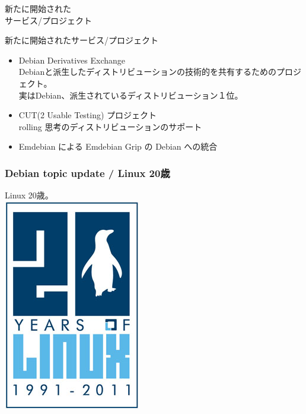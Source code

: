 \begin{frame}
\begin{center}
\LARGE{新たに開始された\\サービス/プロジェクト}
\end{center}
\end{frame}


\begin{frame}{新たに開始されたサービス/プロジェクト}
\begin{itemize}[<+->]
\item Debian Derivatives Exchange\\
Debianと派生したディストリビューションの技術的を共有するためのプロジェクト。\\
実はDebian、派生されているディストリビューション１位。
\item CUT(2 Usable Testing) プロジェクト\\
rolling 思考のディストリビューションのサポート
\item Emdebian による Emdebian Grip の Debian への統合
\end{itemize}
\end{frame}


\begin{frame}
 \frametitle{Debian topic update / Linux 20歳}
\begin{center}

\Large{Linux 20歳。}\\
\includegraphics[width=0.5\hsize]{image201111/linux_20_years_082511.jpg}
\end{center}
\end{frame}


